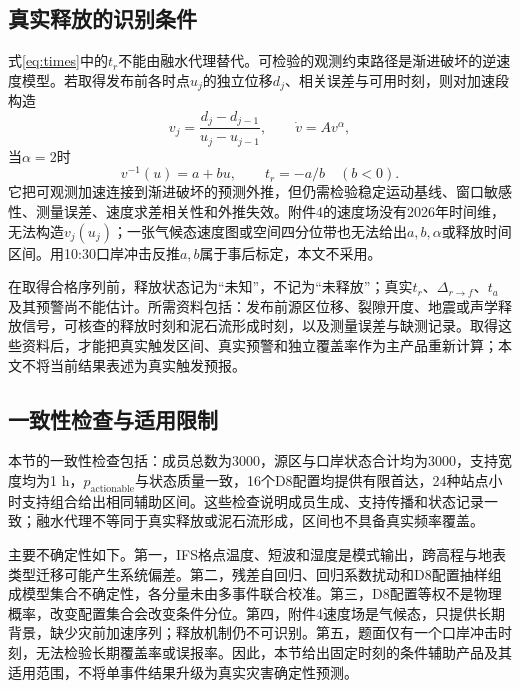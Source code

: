 
\subsection{真实释放的识别条件}
式\eqref{eq:times}中的$t_r$不能由融水代理替代。可检验的观测约束路径是渐进破坏的逆速度模型。若取得发布前各时点$u_j$的独立位移$d_j$、相关误差与可用时刻，则对加速段构造
\begin{equation}
v_j=\frac{d_j-d_{j-1}}{u_j-u_{j-1}},\qquad
\dot v=A v^\alpha,
\end{equation}
当$\alpha=2$时
\begin{equation}
v^{-1}(u)=a+bu,\qquad t_r=-a/b\quad(b<0).
\end{equation}
它把可观测加速连接到渐进破坏的预测外推，但仍需检验稳定运动基线、窗口敏感性、测量误差、速度求差相关性和外推失效。附件4的速度场没有2026年时间维，无法构造$v_j(u_j)$；一张气候态速度图或空间四分位带也无法给出$a,b,\alpha$或释放时间区间。用10:30口岸冲击反推$a,b$属于事后标定，本文不采用。

在取得合格序列前，释放状态记为“未知”，不记为“未释放”；真实$t_r$、$\Delta_{r\to f}$、$t_a$及其预警尚不能估计。所需资料包括：发布前源区位移、裂隙开度、地震或声学释放信号，可核查的释放时刻和泥石流形成时刻，以及测量误差与缺测记录。取得这些资料后，才能把真实触发区间、真实预警和独立覆盖率作为主产品重新计算；本文不将当前结果表述为真实触发预报。

\subsection{一致性检查与适用限制}
本节的一致性检查包括：成员总数为3000，源区与口岸状态合计均为3000，支持宽度均为1 h，$p_{\mathrm{actionable}}$与状态质量一致，16个D8配置均提供有限首达，24种站点小时支持组合给出相同辅助区间。这些检查说明成员生成、支持传播和状态记录一致；融水代理不等同于真实释放或泥石流形成，区间也不具备真实频率覆盖。

主要不确定性如下。第一，IFS格点温度、短波和湿度是模式输出，跨高程与地表类型迁移可能产生系统偏差。第二，残差自回归、回归系数扰动和D8配置抽样组成模型集合不确定性，各分量未由多事件联合校准。第三，D8配置等权不是物理概率，改变配置集合会改变条件分位。第四，附件4速度场是气候态，只提供长期背景，缺少灾前加速序列；释放机制仍不可识别。第五，题面仅有一个口岸冲击时刻，无法检验长期覆盖率或误报率。因此，本节给出固定时刻的条件辅助产品及其适用范围，不将单事件结果升级为真实灾害确定性预测。
